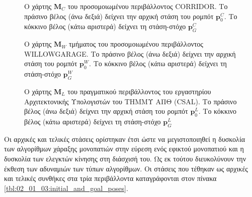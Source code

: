\begin{figure}\centering
  
  \vspace{0.3cm}
  \caption{\small Ο χάρτης $\bm{M}_C$ του προσομοιωμένου περιβάλλοντος CORRIDOR.
           Το πράσινο βέλος (άνω δεξιά) δείχνει την αρχική στάση του ρομπότ
           $\bm{p}_0^C$. Tο κόκκινο βέλος (κάτω αριστερά) δείχνει τη στάση-στόχο
           $\bm{p}_G^C$}
  \label{fig:02_01_03:map_corridor}
\end{figure}

\begin{figure}\centering
  
  \vspace{0.1cm}
  \caption{\small Ο χάρτης $\bm{M}_W$ τμήματος του προσομοιωμένου περιβάλλοντος
           WILLOWGARAGE. Το πράσινο βέλος (άνω δεξιά) δείχνει την αρχική στάση
           του ρομπότ $\bm{p}_0^W$. Tο κόκκινο βέλος (κάτω αριστερά) δείχνει τη
           στάση-στόχο $\bm{p}_G^W$}
  \label{fig:02_01_03:map_willowgarage}
\end{figure}

\begin{figure}\centering
  
  \vspace{-0.2cm}
  \caption{\small Ο χάρτης $\bm{M}_L$ του πραγματικού περιβάλλοντος του
           εργαστηρίου Αρχιτεκτονικής Υπολογιστών του ΤΗΜΜΥ ΑΠΘ (CSAL). Το
           πράσινο βέλος (άνω δεξιά) δείχνει την αρχική στάση του ρομπότ
           $\bm{p}_0^L$. Tο κόκκινο βέλος (κάτω αριστερά) δείχνει τη στάση-στόχο
           $\bm{p}_G^L$}
  \label{fig:02_01_03:map_csal}
\end{figure}

Οι αρχικές και τελικές στάσεις ορίστηκαν έτσι ώστε να μεγιστοποιηθεί η δυσκολία
των αλγορίθμων χάραξης μονοπατιών στην εύρεση ενός εφικτού μονοπατιού και η
δυσκολία των ελεγκτών κίνησης στη διάσχισή του. Ως εκ τούτου διευκολύνουν την
έκθεση των αδυναμιών των τύπων αλγορίθμων. Οι στάσεις που τέθηκαν ως αρχικές
και τελικές συνθήκες στα τρία περιβάλλοντα καταγράφονται στον πίνακα
\ref{tbl:02_01_03:initial_and_goal_poses}.

